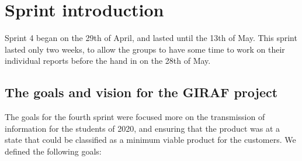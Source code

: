\section{Sprint introduction}\label{sec:sprint-4-introduction}
Sprint 4 began on the 29th of April, and lasted until the 13th of May.
This sprint lasted only two weeks, to allow the groups to have some time to work on their individual reports before the hand in on the 28th of May.

\subsection{The goals and vision for the GIRAF project}\label{subsec:sprint-4-goals}
The goals for the fourth sprint were focused more on the transmission of information for the students of 2020, and ensuring that the product was at a state that could be classified as a minimum viable product for the customers.
We defined the following goals:

